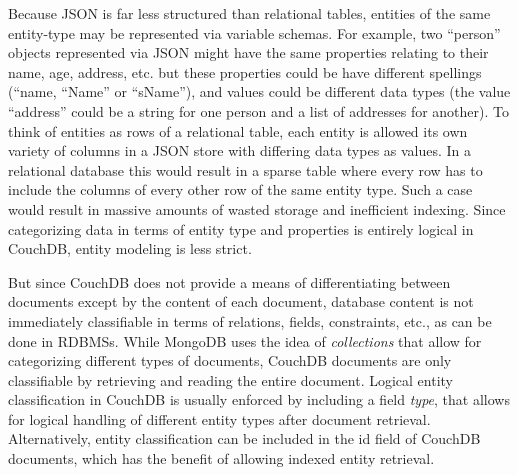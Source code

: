Because JSON is far less structured than relational tables, entities of the same entity-type may be represented via variable schemas. For example, two ``person'' objects represented via JSON might have the same properties relating to their name, age, address, etc. but these properties could be have different spellings (``name, ``Name'' or ``sName''), and values could be different data types (the value ``address'' could be a string for one person and a list of addresses for another). To think of entities as rows of a relational table, each entity is allowed its own variety of columns in a JSON store with differing data types as values. In a relational database this would result in a sparse table where every row has to include the columns of every other row of the same entity type. Such a case would result in massive amounts of wasted storage and inefficient indexing. Since categorizing data in terms of entity type and properties is entirely logical in CouchDB, entity modeling is less strict.

But since CouchDB does not provide a means of differentiating between documents except by the content of each document, database content is not immediately classifiable in terms of relations, fields, constraints, etc., as can be done in RDBMSs. While MongoDB uses the idea of \textit{collections} that allow for categorizing different types of documents, CouchDB documents are only classifiable by retrieving and reading the entire document. Logical entity classification in CouchDB is usually enforced by including a field \textit{type}, that allows for logical handling of different entity types after document retrieval. Alternatively, entity classification can be included in the id field of CouchDB documents, which has the benefit of allowing indexed entity retrieval.